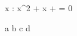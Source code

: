 \documentclass{article}
\begin{document}
\forall x \in {}: \alpha x^2 + \beta x + \gamma = 0

a \rightarrow b \rightarrow c \rightarrow d
\end{document}
